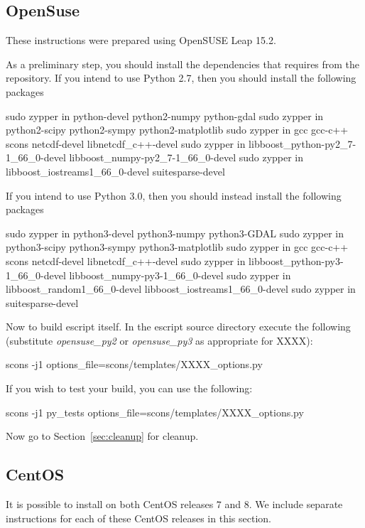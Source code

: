 \subsection{OpenSuse}\label{sec:susesrc}
These instructions were prepared using OpenSUSE Leap 15.2. \newline

\noindent As a preliminary step, you should install the dependencies that \esfinley requires from the repository.
\noindent  If you intend to use Python 2.7, then you should install the following packages
\begin{shellCode}
sudo zypper in python-devel python2-numpy python-gdal
sudo zypper in python2-scipy python2-sympy python2-matplotlib
sudo zypper in gcc gcc-c++ scons netcdf-devel libnetcdf_c++-devel
sudo zypper in libboost_python-py2_7-1_66_0-devel libboost_numpy-py2_7-1_66_0-devel
sudo zypper in libboost_iostreams1_66_0-devel suitesparse-devel
\end{shellCode}

\noindent If you intend to use Python 3.0, then you should instead install the following packages
\begin{shellCode}
sudo zypper in python3-devel python3-numpy python3-GDAL
sudo zypper in python3-scipy python3-sympy python3-matplotlib
sudo zypper in gcc gcc-c++ scons netcdf-devel libnetcdf_c++-devel
sudo zypper in libboost_python-py3-1_66_0-devel libboost_numpy-py3-1_66_0-devel
sudo zypper in libboost_random1_66_0-devel libboost_iostreams1_66_0-devel
sudo zypper in suitesparse-devel
\end{shellCode}

\noindent Now to build escript itself.
\noindent In the escript source directory execute the following (substitute \textit{opensuse_py2} or \textit{opensuse_py3} as appropriate for XXXX):
\begin{shellCode}
scons -j1 options_file=scons/templates/XXXX_options.py
\end{shellCode}

\noindent If you wish to test your build, you can use the following:
\begin{shellCode}
scons -j1 py_tests options_file=scons/templates/XXXX_options.py
\end{shellCode}

\noindent Now go to Section~\ref{sec:cleanup} for cleanup.

\subsection{CentOS}\label{sec:centossrc}
It is possible to install \escript on both CentOS releases $7$ and $8$. We include separate instructions for each of these CentOS releases in this section.
